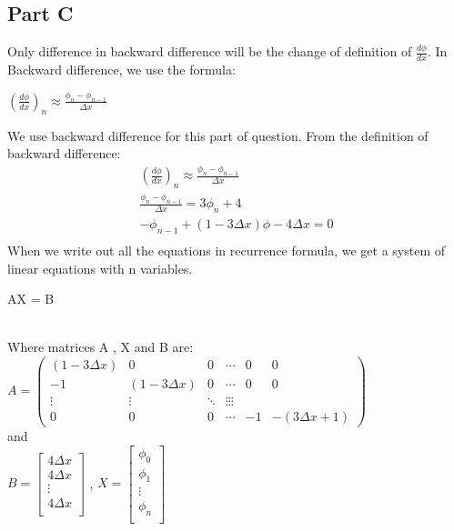 \documentclass{article}
\begin{document}
    \subsection{Part C} %
    \label{sub:part_c}
    Only difference in backward difference will be the change of definition of $\frac{d \phi}{d x}$. In Backward difference, we use the formula: \\
    \centerline{$(\frac{d \phi}{d x})_n \approx \frac{\phi_{n} - \phi_{n-1}}{\Delta x}$}
    We use backward difference for this part of question. From the definition of backward difference:\\
    \begin{align}(\frac{d \phi}{d x})_n \approx \frac{\phi_{n} - \phi_{n-1}}{\Delta x}\\ \nonumber
     \frac{\phi_{n} - \phi_{n-1}}{\Delta x} = 3\phi_{n} + 4 \\ \nonumber
     -\phi_{n-1} +(1 - 3 \Delta x)\phi - 4\Delta x = 0 \\ \nonumber
     \end{align}
     When we write out all the equations in recurrence formula, we get a system of linear equations with n variables.\\
     \centerline{AX = B}\\
     Where matrices A , X and B are:\\
     $A = 
     \begin{pmatrix}
      (1-3\Delta x) & 0 & 0 & \cdots & 0 & 0\\
     -1 & (1-3\Delta x) & 0 & \cdots & 0 &0\\
     \vdots  & \vdots  & \ddots & \vdots \vdots \vdots \\
    0 & 0 & 0 & \cdots & -1 &-(3 \Delta x +1)
     \end{pmatrix}$\\
     and\\
     $B =
     \begin{bmatrix}
     4 \Delta x \\
     4 \Delta x \\
     \vdots \\
     4 \Delta x \\    
     \end{bmatrix}$
     , \hspace{6mm}
     $X =
     \begin{bmatrix}
     \phi _0 \\
     \phi _1 \\
     \vdots \\
     \phi _n \\    
     \end{bmatrix}$\\
\end{document}
